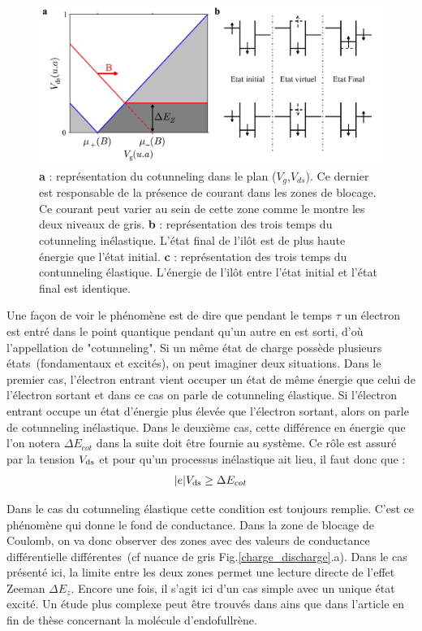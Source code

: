 \begin{figure}
\includegraphics[scale=0.45]{Annexe2/figure5/figure5.pdf} 
\caption{\textbf{a} : représentation du cotunneling dans le plan ($V_g$,$V_{ds}$). Ce dernier est responsable de la présence de courant dans les zones de blocage. Ce courant peut varier au sein de cette zone comme le montre les deux niveaux de gris. \textbf{b} : représentation des trois temps du cotunneling inélastique. L'état final de l'il\^ot est de plus haute énergie que l'état initial. \textbf{c} :  représentation des trois temps du contunneling élastique. L'énergie de l'il\^ot entre l'état initial et l'état final est identique.}
\label{cotun}
\end{figure}


Une façon de voir le phénomène est de dire que pendant le temps $\tau$ un électron est entré dans le point quantique pendant qu'un autre en est sorti, d'où l'appellation de "cotunneling". Si un m\^eme état de charge possède plusieurs états~(fondamentaux et excités), on peut imaginer deux situations. Dans le premier cas, l'électron entrant vient occuper un état de m\^eme énergie que celui de l'électron sortant et dans ce cas on parle de cotunneling élastique. Si l'électron entrant occupe un état d'énergie plus élevée que l'électron sortant, alors on parle de cotunneling inélastique. Dans le deuxième cas, cette différence en énergie que l'on notera $\Delta E_{cot}$ dans la suite doit être fournie au système. Ce rôle est assuré par la tension $V_{\rm{ds}}$ et pour qu'un processus inélastique ait lieu, il faut donc que :
\begin{eqnarray}
|e|V_{\rm{ds}} \geq \Delta E_{cot}
\end{eqnarray}

Dans le cas du cotunneling élastique cette condition est toujours remplie. C'est ce phénomène qui donne le fond de conductance. Dans la zone de blocage de Coulomb, on va donc observer des zones avec des valeurs de conductance différentielle différentes~(cf nuance de gris Fig.\ref{charge_discharge}.a). Dans le cas présenté ici, la limite entre les deux zones permet une lecture directe de l'effet Zeeman $\Delta E_z$. Encore une fois, il s'agit ici d'un cas simple avec un unique état excité. Un étude plus complexe peut \^etre trouvés dans \cite{DeFranceschi2001} ains que dans l'article en fin de thèse concernant la molécule d'endofullrène.\newline

